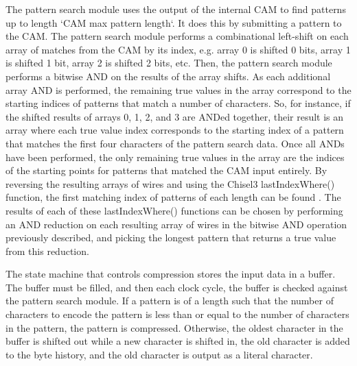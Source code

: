 \documentclass[doublespace,nopageskip]{VTthesis}
\begin{document}
The pattern search module uses the output of the internal CAM to find patterns up to length `CAM max pattern length`. It does this by submitting a pattern to the CAM. The pattern search module performs a combinational left-shift on each array of matches from the CAM by its index, e.g. array 0 is shifted 0 bits, array 1 is shifted 1 bit, array 2 is shifted 2 bits, etc. Then, the pattern search module performs a bitwise AND on the results of the array shifts. As each additional array AND is performed, the remaining true values in the array correspond to the starting indices of patterns that match a number of characters. So, for instance, if the shifted results of arrays 0, 1, 2, and 3 are ANDed together, their result is an array where each true value index corresponds to the starting index of a pattern that matches the first four characters of the pattern search data. Once all ANDs have been performed, the only remaining true values in the array are the indices of the starting points for patterns that matched the CAM input entirely. By reversing the resulting arrays of wires and using the Chisel3 lastIndexWhere() function, the first matching index of patterns of each length can be found \cite{chisel3, chisel3documentation}. The results of each of these lastIndexWhere() functions can be chosen by performing an AND reduction on each resulting array of wires in the bitwise AND operation previously described, and picking the longest pattern that returns a true value from this reduction.

The state machine that controls compression stores the input data in a buffer. The buffer must be filled, and then each clock cycle, the buffer is checked against the pattern search module. If a pattern is of a length such that the number of characters to encode the pattern is less than or equal to the number of characters in the pattern, the pattern is compressed. Otherwise, the oldest character in the buffer is shifted out while a new character is shifted in, the old character is added to the byte history, and the old character is output as a literal character.
\end{document}
